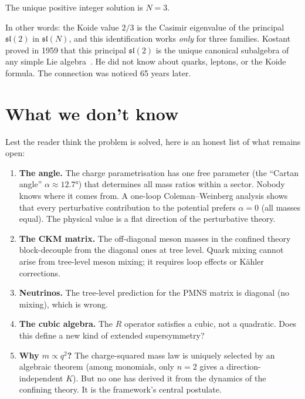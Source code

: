 \documentclass[11pt,a4paper]{article}
\begin{document}
The unique positive integer solution is $N = 3$.

In other words: the Koide value $2/3$ is the Casimir eigenvalue
of the principal $\mathfrak{sl}(2)$ in $\mathfrak{sl}(N)$, and
this identification works \emph{only} for three families.
Kostant proved in 1959 that this principal
$\mathfrak{sl}(2)$ is the unique canonical subalgebra of any
simple Lie algebra~\cite{Kostant:1959}.
He did not know about quarks, leptons, or the Koide formula.
The connection was noticed 65 years later.


\section{What we don't know}

Lest the reader think the problem is solved, here is an honest
list of what remains open:

\begin{enumerate}
  \item \textbf{The angle.} The charge parametrisation has one
    free parameter (the ``Cartan angle'' $\alpha \approx 12.7°$)
    that determines all mass ratios within a sector. Nobody knows
    where it comes from. A one-loop Coleman--Weinberg analysis
    shows that every perturbative contribution to the potential
    prefers $\alpha = 0$ (all masses equal). The physical value
    is a flat direction of the perturbative theory.

  \item \textbf{The CKM matrix.} The off-diagonal meson masses
    in the confined theory block-decouple from the diagonal ones
    at tree level. Quark mixing cannot arise from tree-level meson
    mixing; it requires loop effects or K\"ahler corrections.

  \item \textbf{Neutrinos.} The tree-level prediction for the
    PMNS matrix is diagonal (no mixing), which is wrong.

  \item \textbf{The cubic algebra.} The $R$ operator satisfies a
    cubic, not a quadratic. Does this define a new kind of
    extended supersymmetry?

  \item \textbf{Why $m \propto q^2$?} The charge-squared mass
    law is uniquely selected by an algebraic theorem (among
    monomials, only $n = 2$ gives a direction-independent $K$).
    But no one has derived it from the dynamics of the confining
    theory. It is the framework's central postulate.
\end{enumerate}
\end{document}
